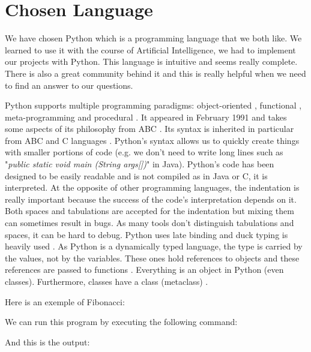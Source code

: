 \section{Chosen Language}
We have chosen Python which is a programming language that we both like. We learned to use it with the course of Artificial Intelligence, we had to implement our projects with Python. This language is intuitive and seems really complete. There is also a great community behind it and this is really helpful when we need to find an answer to our questions.

Python supports multiple programming paradigms: object-oriented \cite{martelli2006python} \cite{functional_doc}, functional \cite{functional_doc} \cite{devtome}, meta-programming \cite{mihai} and procedural \cite{martelli2006python} \cite{functional_doc}.
It appeared in February 1991 and takes some aspects of its philosophy from ABC \cite{python_why}. Its syntax is inherited in particular from ABC and C languages \cite{wikipediaEN_history_python}. Python's syntax allows us to quickly create things with smaller portions of code (e.g. we don't need to write long lines such as "\textit{public static void main (String args[])}" in Java).
Python's code has been designed to be easily readable \cite{ZenPython} and is not compiled as in Java or C, it is interpreted.
At the opposite of other programming languages, the indentation is really important because the success of the code's interpretation depends on it. Both spaces and tabulations are accepted for the indentation but mixing them can sometimes result in bugs. As many tools don't distinguish tabulations and spaces, it can be hard to debug.
Python uses late binding \cite{python_pep0289} and duck typing is heavily used \cite{wikipediaEN_duck_typing_python}.
As Python is a dynamically typed language, the type is carried by the values, not by the variables. These ones hold references to objects and these references are passed to functions \cite{wikipediaEN_python_syntax_semantics}.
Everything is an object in Python (even classes). Furthermore, classes have a class (metaclass) \cite{python_datamodel}.
\newline

Here is an exemple of Fibonacci:


We can run this program by executing the following command:


And this is the output:



